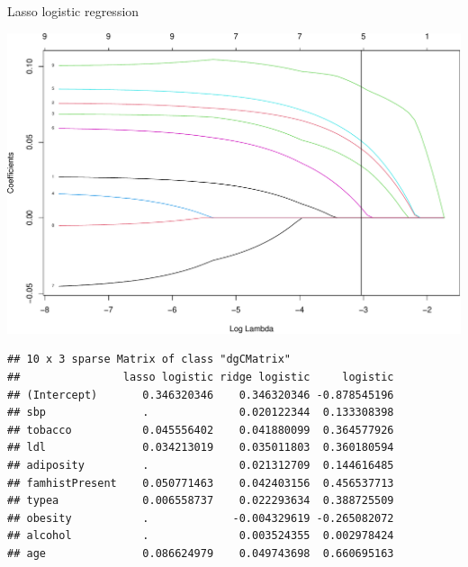\documentclass[
  ignorenonframetext,
]{beamer}
\newenvironment{Shaded}{\begin{snugshade}}{\end{snugshade}}
\newcommand{\CommentTok}[1]{\textcolor[rgb]{0.56,0.35,0.01}{\textit{#1}}}
\newcommand{\DataTypeTok}[1]{\textcolor[rgb]{0.13,0.29,0.53}{#1}}
\newcommand{\FloatTok}[1]{\textcolor[rgb]{0.00,0.00,0.81}{#1}}
\newcommand{\KeywordTok}[1]{\textcolor[rgb]{0.13,0.29,0.53}{\textbf{#1}}}
\newcommand{\NormalTok}[1]{#1}
\newcommand{\OperatorTok}[1]{\textcolor[rgb]{0.81,0.36,0.00}{\textbf{#1}}}
\newcommand{\OtherTok}[1]{\textcolor[rgb]{0.56,0.35,0.01}{#1}}
\newcommand{\StringTok}[1]{\textcolor[rgb]{0.31,0.60,0.02}{#1}}
\begin{document}
\begin{frame}[fragile]
\begin{block}{Lasso logistic regression}
\begin{Shaded}
\end{Shaded}

\includegraphics{L3_files/figure-beamer/unnamed-chunk-8-3.pdf}

\begin{Shaded}
\end{Shaded}

\begin{verbatim}
## 10 x 3 sparse Matrix of class "dgCMatrix"
##                lasso logistic ridge logistic     logistic
## (Intercept)       0.346320346    0.346320346 -0.878545196
## sbp               .              0.020122344  0.133308398
## tobacco           0.045556402    0.041880099  0.364577926
## ldl               0.034213019    0.035011803  0.360180594
## adiposity         .              0.021312709  0.144616485
## famhistPresent    0.050771463    0.042403156  0.456537713
## typea             0.006558737    0.022293634  0.388725509
## obesity           .             -0.004329619 -0.265082072
## alcohol           .              0.003524355  0.002978424
## age               0.086624979    0.049743698  0.660695163
\end{verbatim}


\end{block}
\end{frame}
\end{document}
